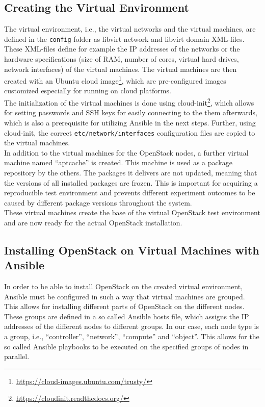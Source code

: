 \subsection{Creating the Virtual Environment}
\label{subsec:createve}
The virtual environment, i.e., the virtual networks and the virtual machines, are defined in the \verb|config| folder as libvirt network and libvirt domain XML-files. These XML-files define for example the IP addresses of the networks or the hardware specifications (size of RAM, number of cores, virtual hard drives, network interfaces) of the virtual machines. The virtual machines are then created with an Ubuntu cloud image\footnote{\url{https://cloud-images.ubuntu.com/trusty/}}, which are pre-configured images customized especially for running on cloud platforms. \\

The initialization of the virtual machines is done using cloud-init\footnote{\url{https://cloudinit.readthedocs.org/}}, which allows for setting passwords and SSH keys for easily connecting to the them afterwards, which is also a prerequisite for utilizing Ansible in the next steps. Further, using cloud-init, the correct \verb|etc/network/interfaces| configuration files are copied to the virtual machines. \\

In addition to the virtual machines for the OpenStack nodes, a further virtual machine named ``aptcache'' is created. This machine is used as a package repository by the others. The packages it delivers are not updated, meaning that the versions of all installed packages are frozen. This is important for acquiring a reproducible test environment and prevents different experiment outcomes to be caused by different package versions throughout the system.\\

These virtual machines create the base of the virtual OpenStack test environment and are now ready for the actual OpenStack installation.

\subsection{Installing OpenStack on Virtual Machines with Ansible}
In order to be able to install OpenStack on the created virtual environment, Ansible must be configured in such a way that virtual machines are grouped. This allows for installing different parts of OpenStack on the different nodes. These groups are defined in a so called Ansible hosts file, which assigns the IP addresses of the different nodes to different groups. In our case, each node type is a group, i.e., ``controller'', ``network'', ``compute'' and ``object''. This allows for the so called Ansible playbooks to be executed on the specified groups of nodes in parallel. \\

